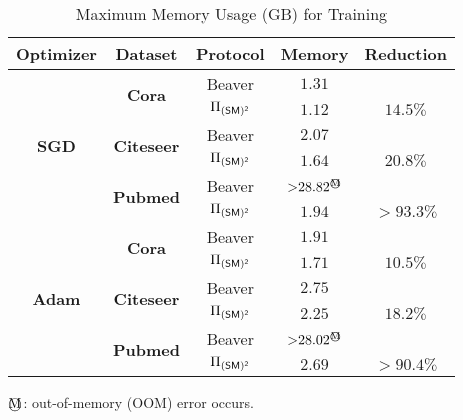 \begin{table}[!t]
 	\caption{Maximum Memory Usage (GB) for Training}
 	\label{table:mem_smm}
 	\setlength\tabcolsep{3pt}
 	\centering
 	\begin{tabular}{c|c|c|c|c}
 	\hline
	\textbf{Optimizer} & 	\textbf{Dataset} & \textbf{Protocol} & \textbf{Memory} & \textbf{Reduction} 
	\\
 	\hline 
	\multirow{6}{*}{\textbf{SGD}} &\multirow{2}{*}{\textbf{Cora}} & Beaver & $1.31$ &
	\\
 	 & & \cellcolor{grayL}$\Pi_{\mathsf{(SM)^2}}$ & 	\cellcolor{grayL}$1.12$ & \cellcolor{grayL}$14.5\%$
 	\\\cline{2-5}
 	 & \multirow{2}{*}{\textbf{Citeseer}} & Beaver & $2.07$ &
	\\
 	 & & \cellcolor{grayL}$\Pi_{\mathsf{(SM)^2}}$ & \cellcolor{grayL}$1.64$ & \cellcolor{grayL}$20.8\%$ 
	\\\cline{2-5}
	 & \multirow{2}{*}{\textbf{Pubmed}} & Beaver & ${>}28.82^{\mathbin{\text{\textcircled{M}}}}$ & 
	\\
	 & & \cellcolor{grayL}$\Pi_{\mathsf{(SM)^2}}$ & \cellcolor{grayL}$1.94$ & \cellcolor{grayL}${>}93.3\%$
	\\\hline
 	\multirow{6}{*}{\textbf{Adam}} & \multirow{2}{*}{\textbf{Cora}} & Beaver & $1.91$ &
	\\
 	 & & \cellcolor{grayL}$\Pi_{\mathsf{(SM)^2}}$ & 	\cellcolor{grayL}$1.71$ & \cellcolor{grayL}$10.5\%$
	\\\cline{2-5}
 	 & \multirow{2}{*}{\textbf{Citeseer}} & Beaver & $2.75$ &
	\\
 	 & & \cellcolor{grayL}$\Pi_{\mathsf{(SM)^2}}$ & 	\cellcolor{grayL}$2.25$ & \cellcolor{grayL}$18.2\%$ 
	\\\cline{2-5}
	 & \multirow{2}{*}{\textbf{Pubmed}} & Beaver & ${>}28.02^{\mathbin{\text{\textcircled{M}}}}$ & 
	\\
	 & & \cellcolor{grayL}$\Pi_{\mathsf{(SM)^2}}$ & \cellcolor{grayL}$2.69$ & \cellcolor{grayL}${>}90.4\%$ 
	\\\hline
 \end{tabular}
 \begin{tablenotes}
 \item  ${\mathbin{\text{\textcircled{M}}}}$:  out-of-memory (OOM) error occurs.
 \end{tablenotes}
\end{table}

